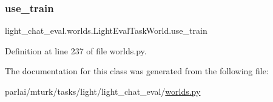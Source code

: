 \subsubsection{\texorpdfstring{use\+\_\+train}{use\_train}}
{\footnotesize\ttfamily light\+\_\+chat\+\_\+eval.\+worlds.\+Light\+Eval\+Task\+World.\+use\+\_\+train}



Definition at line 237 of file worlds.\+py.



The documentation for this class was generated from the following file\+:\begin{DoxyCompactItemize}
\item 
parlai/mturk/tasks/light/light\+\_\+chat\+\_\+eval/\hyperlink{parlai_2mturk_2tasks_2light_2light__chat__eval_2worlds_8py}{worlds.\+py}\end{DoxyCompactItemize}
